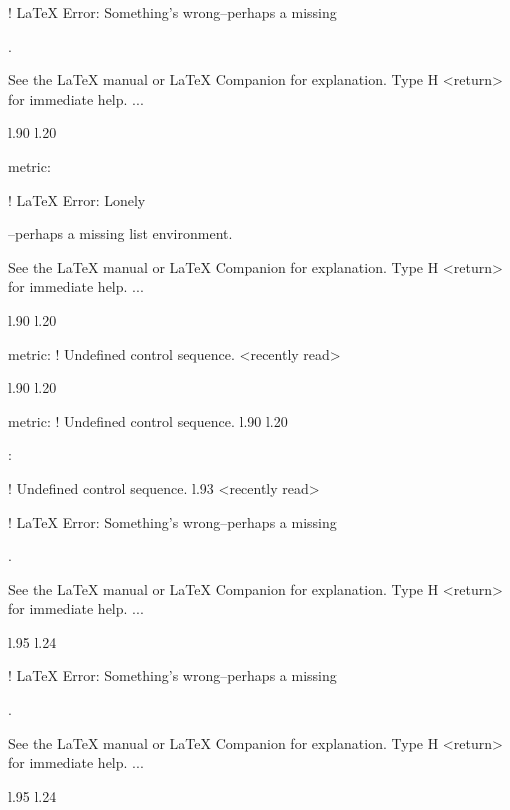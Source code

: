 {{{{{! LaTeX Error: Something's wrong--perhaps a missing \item.

See the LaTeX manual or LaTeX Companion for explanation.
Type  H <return>  for immediate help.
 ...                                              
                                                  
l.90 l.20     \item \xmlNode
                            {metric}: \xmlDesc

! LaTeX Error: Lonely \item--perhaps a missing list environment.

See the LaTeX manual or LaTeX Companion for explanation.
Type  H <return>  for immediate help.
 ...                                              
                                                  
l.90 l.20     \item \xmlNode
                            {metric}: \xmlDesc
! Undefined control sequence.
<recently read> \xmlNode 
                         
l.90 l.20     \item \xmlNode
                            {metric}: \xmlDesc
! Undefined control sequence.
l.90 l.20     \item {}: \xmlDesc
                                              
! Undefined control sequence.
l.93 <recently read> \xmlNode
                             

! LaTeX Error: Something's wrong--perhaps a missing \item.

See the LaTeX manual or LaTeX Companion for explanation.
Type  H <return>  for immediate help.
 ...                                              
                                                  
l.95 l.24     \item \xmlNode
                            

! LaTeX Error: Something's wrong--perhaps a missing \item.

See the LaTeX manual or LaTeX Companion for explanation.
Type  H <return>  for immediate help.
 ...                                              
                                                  
l.95 l.24     \item \xmlNode
                            

}}}}}
